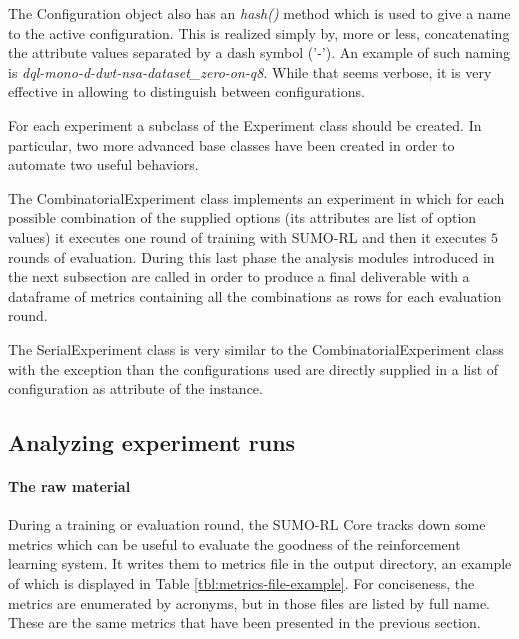 The Configuration object also has an \textit{hash()} method which is used to give a name to the active configuration.
This is realized simply by, more or less, concatenating the attribute values separated by a dash symbol ('-').
An example of such naming is \textit{dql-mono-d-dwt-nsa-dataset\_zero-on-q8}.
While that seems verbose, it is very effective in allowing to distinguish between configurations.

For each experiment a subclass of the Experiment class should be created.
In particular, two more advanced base classes have been created in order to automate two useful behaviors.

The CombinatorialExperiment class implements an experiment in which for each possible combination of the supplied options (its attributes are list of option values) it executes one round of training with SUMO-RL and then it executes $5$ rounds of evaluation.
During this last phase the analysis modules introduced in the next subsection are called in order to produce a final deliverable with a dataframe of metrics containing all the combinations as rows for each evaluation round.

The SerialExperiment class is very similar to the CombinatorialExperiment class with the exception than the configurations used are directly supplied in a list of configuration as attribute of the instance.


\subsection{Analyzing experiment runs}

\paragraph{The raw material}

During a training or evaluation round, the SUMO-RL Core tracks down some metrics which can be useful to evaluate the goodness of the reinforcement learning system.
It writes them to metrics file in the output directory, an example of which is displayed in Table \ref{tbl:metrics-file-example}.
For conciseness, the metrics are enumerated by acronyms, but in those files are listed by full name.
These are the same metrics that have been presented in the previous section.

